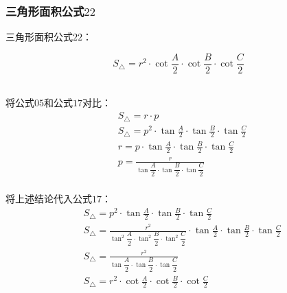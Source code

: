 \documentclass[UTF8]{ctexart}
\begin{document}
\subsubsection{三角形面积公式$22$}
    三角形面积公式$22$：
    \begin{large}
        \begin{equation*}
            S_{\triangle}=r^2\cdot\cot{\frac{A}{2}}\cdot\cot{\frac{B}{2}}\cdot\cot{\frac{C}{2}}
        \end{equation*}
    \end{large}\\
    将公式$05$和公式$17$对比：
    \setcounter{equation}{0}
    \begin{align}
        &S_{\triangle}=r\cdot p\\[3mm]
        &S_{\triangle}=p^2\cdot\tan{\frac{A}{2}}\cdot\tan{\frac{B}{2}}\cdot\tan{\frac{C}{2}}\\[3mm]
        &r=p\cdot\tan{\frac{A}{2}}\cdot\tan{\frac{B}{2}}\cdot\tan{\frac{C}{2}}\\[3mm]
        &p=\frac{r}{\tan{\dfrac{A}{2}}\cdot\tan{\dfrac{B}{2}}\cdot\tan{\dfrac{C}{2}}}
    \end{align}\\
    将上述结论代入公式$17$：\vspace{5pt}
    \begin{align}
        &S_{\triangle}=p^2\cdot\tan{\frac{A}{2}}\cdot\tan{\frac{B}{2}}\cdot\tan{\frac{C}{2}}\\[3mm]
        &S_{\triangle}=\frac{r^2}{\tan^2{\dfrac{A}{2}}\cdot\tan^2{\dfrac{B}{2}}\cdot\tan^2{\dfrac{C}{2}}}\cdot\tan{\frac{A}{2}}\cdot\tan{\frac{B}{2}}\cdot\tan{\frac{C}{2}}\\[3mm]
        &S_{\triangle}=\frac{r^2}{\tan{\dfrac{A}{2}}\cdot\tan{\dfrac{B}{2}}\cdot\tan{\dfrac{C}{2}}}\\[3mm]
        &S_{\triangle}=r^2\cdot\cot{\frac{A}{2}}\cdot\cot{\frac{B}{2}}\cdot\cot{\frac{C}{2}}
    \end{align}

    
\end{document}
